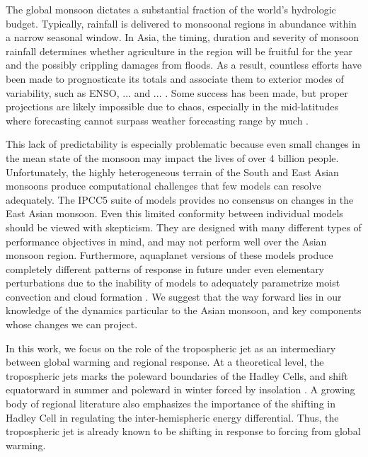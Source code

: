 	The global monsoon dictates a substantial fraction of the world's hydrologic budget. Typically, rainfall is delivered to monsoonal regions in abundance within a narrow seasonal window. In Asia, the timing, duration and severity of monsoon rainfall determines whether agriculture in the region will be fruitful for the year and the possibly crippling damages from floods. As a result, countless efforts have been made to prognosticate its totals and associate them to exterior modes of variability, such as ENSO, ... and ... . Some success has been made, but proper projections are likely impossible due to chaos, especially in the mid-latitudes where forecasting cannot surpass weather forecasting range by much \citep{Teng2013}.
	
	This lack of predictability is especially problematic because even small changes in the mean state of the monsoon may impact the lives of over 4 billion people. Unfortunately, the highly heterogeneous terrain of the South and East Asian monsoons produce computational challenges that few models can resolve adequately. The IPCC5 suite of models provides no consensus on changes in the East Asian monsoon. Even this limited conformity between individual models should be viewed with skepticism. They are designed with many different types of performance objectives in mind, and may not perform well over the Asian monsoon region. Furthermore, aquaplanet versions of these models produce completely different patterns of response in future under even elementary perturbations due to the inability of models to adequately parametrize moist convection and cloud formation \citep{Stevens2013}. We suggest that the way forward lies in our knowledge of the dynamics particular to the Asian monsoon, and key components whose changes we can project.

	In this work, we focus on the role of the tropospheric jet as an intermediary between global warming and regional response. At a theoretical level, the tropospheric jets marks the poleward boundaries of the Hadley Cells, and shift equatorward in summer and poleward in winter forced by insolation \citep{Bordoni2008}. A growing body of regional literature also emphasizes the importance of the shifting in Hadley Cell in regulating the inter-hemispheric energy differential. Thus, the tropospheric jet is already known to be shifting in response to forcing from global warming.

